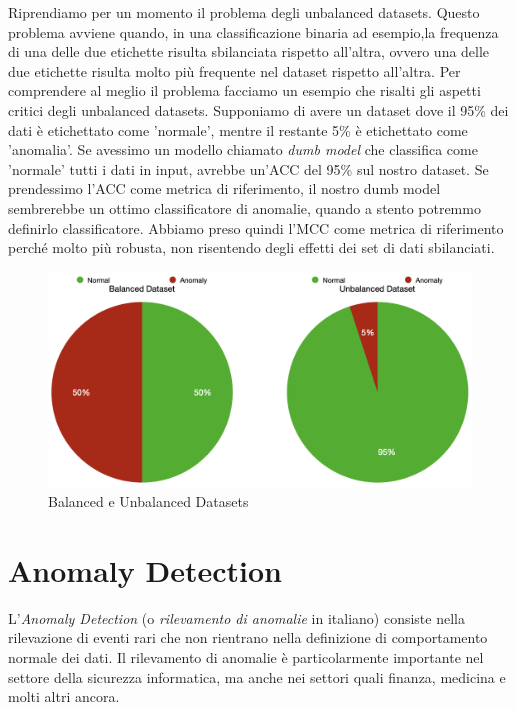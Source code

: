 \vspace{1.5cm}

Riprendiamo per un momento il problema degli unbalanced datasets. Questo problema avviene quando, in una classificazione binaria ad esempio,la frequenza di una delle due etichette risulta sbilanciata rispetto all'altra, ovvero una delle due etichette risulta molto pi\`u frequente nel dataset rispetto all'altra. Per comprendere al meglio il problema facciamo un esempio che risalti gli aspetti critici degli unbalanced datasets. Supponiamo di avere un dataset dove il 95\% dei dati \`e etichettato come 'normale', mentre il restante 5\% \`e etichettato come 'anomalia'. Se avessimo un modello chiamato \textit{dumb model} che classifica come 'normale' tutti i dati in input, avrebbe un'ACC del 95\% sul nostro dataset. Se prendessimo l'ACC come metrica di riferimento, il nostro dumb model sembrerebbe un ottimo classificatore di anomalie, quando a stento potremmo definirlo classificatore. Abbiamo preso quindi l'MCC come metrica di riferimento perch\'e molto pi\`u robusta, non risentendo degli effetti dei set di dati sbilanciati.
    
\begin{figure}[H]
    \centering
    \includegraphics[width=0.7\linewidth]{Balanced_Unbalanced_Dataset.png}
    \caption{Balanced e Unbalanced Datasets}
    \label{fig:enter-label}
\end{figure}

\vspace{1cm}

\section{Anomaly Detection}
L'\textit{Anomaly Detection} (o \textit{rilevamento di anomalie} in italiano) consiste nella rilevazione di eventi rari che non rientrano nella definizione di comportamento normale dei dati. Il rilevamento di anomalie \`e particolarmente importante nel settore della sicurezza informatica, ma anche nei settori quali finanza, medicina e molti altri ancora. 


